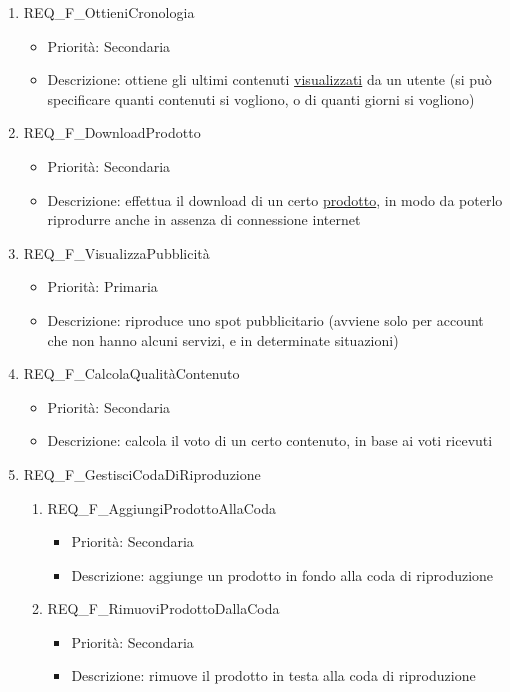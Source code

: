 \begin{enumerate}
	\item REQ\_F\_OttieniCronologia
		\begin{itemize}	
		\item Priorità: Secondaria
		\item Descrizione: ottiene gli ultimi contenuti \hyperlink{AnReqVisual}{visualizzati} da un utente (si può specificare quanti contenuti si vogliono, o di quanti giorni si vogliono)
		\end{itemize}

	\item REQ\_F\_DownloadProdotto
		\begin{itemize}	
		\item Priorità: Secondaria
		\item Descrizione: effettua il download di un certo \hyperlink{AnReqProdMult}{prodotto}, in modo da poterlo riprodurre anche in assenza di connessione internet
		\end{itemize}
	
	\item REQ\_F\_VisualizzaPubblicità
		\begin{itemize}
		\item Priorità: Primaria
		\item Descrizione: riproduce uno spot pubblicitario (avviene solo per account che non hanno alcuni servizi, e in determinate situazioni)
		\end{itemize}
	
		
	\item REQ\_F\_CalcolaQualitàContenuto
		\begin{itemize}	
		\item Priorità: Secondaria
		\item Descrizione: calcola il voto di un certo contenuto, in base ai voti ricevuti
		\end{itemize}
	
	\item REQ\_F\_GestisciCodaDiRiproduzione
		\begin{enumerate}[label*=\arabic*.]
		\item REQ\_F\_AggiungiProdottoAllaCoda
			\begin{itemize}	
			\item Priorità: Secondaria
			\item Descrizione: aggiunge un prodotto in fondo alla coda di riproduzione
			\end{itemize}
		\item REQ\_F\_RimuoviProdottoDallaCoda
			\begin{itemize}	
			\item Priorità: Secondaria
			\item Descrizione: rimuove il prodotto in testa alla coda di riproduzione
			\end{itemize}
		\end{enumerate}


\end{enumerate}

